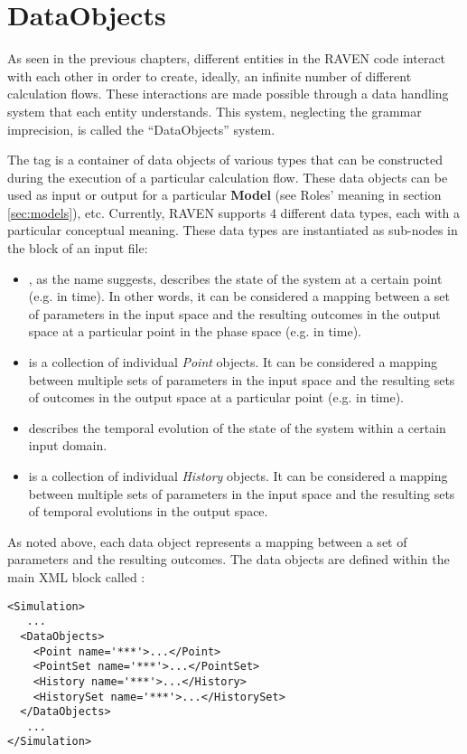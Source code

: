\section{DataObjects}
\label{sec:DataObjects}

As seen in the previous chapters, different entities in the RAVEN
code interact with each other in order to create, ideally, an infinite number of
different calculation flows.
%
These interactions are made possible through a data handling system that each
entity understands.
%
This system, neglecting the grammar imprecision, is called the ``DataObjects''
system.

The  tag is a container of data objects of various types that can
be constructed during the execution of a particular calculation flow.
%
These data objects can be used as input or output for a particular
\textbf{Model} (see Roles' meaning in section \ref{sec:models}), etc.
%
Currently, RAVEN supports 4 different data types, each with a particular
conceptual meaning.
%
These data types are instantiated as sub-nodes in the  block of
an input file:
\begin{itemize}
  \item {}, as the name suggests, describes the state of the
  system at a certain point (e.g. in time).
  In other words, it can be considered a mapping between a set of parameters
  in the input space and the resulting outcomes in the output space at a
  particular point in the phase space (e.g. in time).
  \item {} is a collection of individual \textit{Point}
  objects.
  It can be considered a mapping between multiple sets of parameters in the
  input space and the resulting sets of outcomes in the output space at a
  particular point (e.g. in time).
  \item {} describes the temporal evolution of the state of the
  system within a certain input domain.
  \item {} is a collection of individual \textit{History}
  objects.
  It can be considered a mapping between multiple sets of parameters in the
  input space and the resulting sets of temporal evolutions in the output
  space.
\end{itemize}

As noted above, each data object represents a mapping between a set of
parameters and the resulting outcomes.
%
The data objects are defined within the main XML block called :
\begin{lstlisting}[style=XML]
<Simulation>
   ...
  <DataObjects>
    <Point name='***'>...</Point>
    <PointSet name='***'>...</PointSet>
    <History name='***'>...</History>
    <HistorySet name='***'>...</HistorySet>
  </DataObjects>
   ...
</Simulation>
\end{lstlisting}

